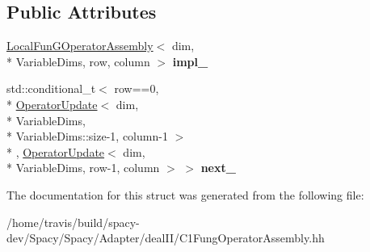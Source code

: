 \subsection*{Public Attributes}
\begin{DoxyCompactItemize}
\item 
\hypertarget{structSpacy_1_1dealII_1_1Detail_1_1OperatorUpdate_aa7faefd5ccd7c71ef796d42b670297ee}{\hyperlink{structSpacy_1_1dealII_1_1Detail_1_1LocalFunGOperatorAssembly}{Local\-Fun\-G\-Operator\-Assembly}$<$ dim, \\*
Variable\-Dims, row, column $>$ {\bfseries impl\-\_\-}}\label{structSpacy_1_1dealII_1_1Detail_1_1OperatorUpdate_aa7faefd5ccd7c71ef796d42b670297ee}

\item 
\hypertarget{structSpacy_1_1dealII_1_1Detail_1_1OperatorUpdate_a3201840a88fe662079fa05197a0583c9}{std\-::conditional\-\_\-t$<$ row==0, \\*
\hyperlink{structSpacy_1_1dealII_1_1Detail_1_1OperatorUpdate}{Operator\-Update}$<$ dim, \\*
Variable\-Dims, \\*
Variable\-Dims\-::size-\/1, column-\/1 $>$\\*
, \hyperlink{structSpacy_1_1dealII_1_1Detail_1_1OperatorUpdate}{Operator\-Update}$<$ dim, \\*
Variable\-Dims, row-\/1, column $>$ $>$ {\bfseries next\-\_\-}}\label{structSpacy_1_1dealII_1_1Detail_1_1OperatorUpdate_a3201840a88fe662079fa05197a0583c9}

\end{DoxyCompactItemize}


The documentation for this struct was generated from the following file\-:\begin{DoxyCompactItemize}
\item 
/home/travis/build/spacy-\/dev/\-Spacy/\-Spacy/\-Adapter/deal\-I\-I/C1\-Fung\-Operator\-Assembly.\-hh\end{DoxyCompactItemize}
